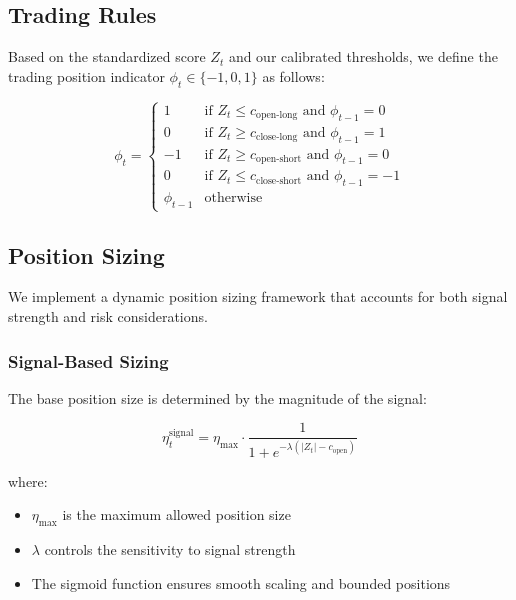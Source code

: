 \subsection{Trading Rules}

Based on the standardized score $Z_t$ and our calibrated thresholds, we define the trading position indicator $\phi_t \in \{-1, 0, 1\}$ as follows:

\begin{equation}
    \phi_t = \begin{cases}
        1 & \text{if } Z_t \leq c_{\text{open-long}} \text{ and } \phi_{t-1} = 0 \\
        0 & \text{if } Z_t \geq c_{\text{close-long}} \text{ and } \phi_{t-1} = 1 \\
        -1 & \text{if } Z_t \geq c_{\text{open-short}} \text{ and } \phi_{t-1} = 0 \\
        0 & \text{if } Z_t \leq c_{\text{close-short}} \text{ and } \phi_{t-1} = -1 \\
        \phi_{t-1} & \text{otherwise}
    \end{cases}
\end{equation}

\subsection{Position Sizing}

We implement a dynamic position sizing framework that accounts for both signal strength and risk considerations.

\subsubsection{Signal-Based Sizing}
The base position size is determined by the magnitude of the signal:

\begin{equation}
    \eta_t^{\text{signal}} = \eta_{\text{max}} \cdot \frac{1}{1 + e^{-\lambda(|Z_t| - c_{\text{open}})}}
\end{equation}

where:
\begin{itemize}
    \item $\eta_{\text{max}}$ is the maximum allowed position size
    \item $\lambda$ controls the sensitivity to signal strength
    \item The sigmoid function ensures smooth scaling and bounded positions
\end{itemize}


